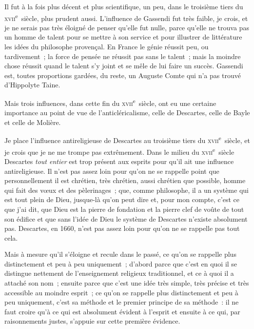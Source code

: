 \documentclass[french,twoside]{book} %
\begin{document}
\noindent Il fut à la fois plus décent et plus scientifique, un peu, dans le troisième tiers du \textsc{xvii}\textsuperscript{e} siècle, plus prudent aussi. L’influence de Gassendi fut très faible, je crois, et je ne serais pas très éloigné de penser qu’elle fut nulle, parce qu’elle ne trouva pas un homme de talent pour se mettre à son service et pour illustrer de littérature les idées du philosophe provençal. En France le génie réussit peu, ou tardivement ; la force de pensée ne réussit pas  sans le talent ; mais la moindre chose réussit quand le talent s’y joint et se mêle de lui faire un succès. Gassendi est, toutes proportions gardées, du reste, un Auguste Comte qui n’a pas trouvé d’Hippolyte Taine.\par
Mais trois influences, dans cette fin du \textsc{xvii}\textsuperscript{e} siècle, ont eu une certaine importance au point de vue de l’anticléricalisme, celle de Descartes, celle de Bayle et celle de Molière.\par
Je place l’influence antireligieuse de Descartes au troisième tiers du \textsc{xvii}\textsuperscript{e} siècle, et je crois que je ne me trompe pas extrêmement. Dans le milieu du \textsc{xvii}\textsuperscript{e} siècle Descartes {\itshape tout entier} est trop présent aux esprits pour qu’il ait une influence antireligieuse. Il n’est pas assez loin pour qu’on ne se rappelle point que personnellement il est chrétien, très chrétien, aussi chrétien que possible, homme qui fait des vœux et des pèlerinages ; que, comme philosophe, il a un système qui est tout plein de Dieu, jusque-là qu’on peut dire et, pour mon compte, c’est ce que j’ai dit, que Dieu est la pierre de fondation et la pierre clef de voûte de tout son édifice et que sans l’idée de Dieu le système de Descartes n’existe absolument pas. Descartes, en 1660, n’est pas assez loin pour qu’on ne se rappelle pas tout cela.\par
Mais à mesure qu’il s’éloigne et recule dans le  passé, ce qu’on se rappelle plus distinctement et peu à peu uniquement ; d’abord parce que c’est en quoi il se distingue nettement de l’enseignement religieux traditionnel, et ce à quoi il a attaché son nom ; ensuite parce que c’est une idée très simple, très précise et très accessible au moindre esprit ; ce qu’on se rappelle plus distinctement et peu à peu uniquement, c’est sa méthode et le premier principe de sa méthode : il ne faut croire qu’à ce qui est absolument évident à l’esprit et ensuite à ce qui, par raisonnements justes, s’appuie sur cette première évidence.\par
\end{document}
